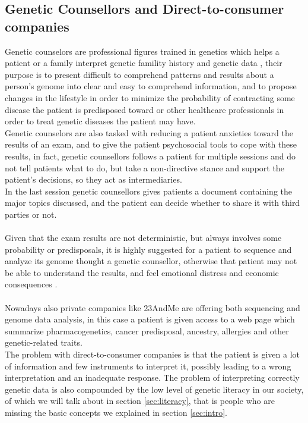 \documentclass[12pt]{article}
\begin{document}
\subsection{Genetic Counsellors and Direct-to-consumer companies}
Genetic counselors are professional figures trained in genetics which helps a patient or a family interpret genetic famility history and genetic data \cite{understanding_genetics}, 
their purpose is to present difficult to comprehend patterns and results about a person's genome into clear and easy to comprehend information, 
and to propose changes in the lifestyle in order to minimize the probability of contracting some disease the patient is predisposed toward or other healthcare professionals 
in order to treat genetic diseases the patient may have.\\
Genetic counselors are also tasked with reducing a patient anxieties toward the results of an exam, and to give the patient psychosocial tools to cope with these results, 
in fact, genetic counsellors follows a patient for multiple sessions and do not tell patients what to do, but take a non-directive stance and support the patient's decisions, so they act as intermediaries.\\
In the last session genetic counsellors gives patients a document containing the major topics discussed, and the patient can decide whether to share it with third parties or not.\\
\\
Given that the exam results are not deterministic, but always involves some probability or predisposals,
it is highly suggested for a patient to sequence and analyze its genome thought a genetic counsellor, otherwise that patient may not be able to understand the results,
and feel emotional distress and economic consequences \cite{understanding_genetics}.\\
\\
Nowadays also private companies like 23AndMe \cite{23andme} are offering both sequencing and genome data analysis, in this case 
a patient is given access to a web page which summarize pharmacogenetics, cancer predisposal, ancestry, allergies and other genetic-related traits.\\
The problem with direct-to-consumer companies is that the patient is given a lot of information and few instruments to interpret it, possibly leading to a wrong interpretation 
and an inadequate response. The problem of interpreting correctly genetic data is also compounded by the low level of genetic literacy in our society, of which we will talk about in 
section \ref{sec:literacy}, that is people who are missing the basic concepts we explained in section \ref{sec:intro}.
\end{document}
